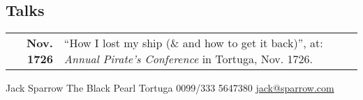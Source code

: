 \documentclass[lighthipster]{Mine}
\newlength{\rightcolwidth}
\begin{document}
\begin{paracol}{2}
\begin{minipage}[t]{0.3\textwidth}
		\section*{Talks}
		\begin{tabular}{>{\footnotesize\bfseries}r >{\footnotesize}p{}}
			Nov. 1726 & ``How I lost my ship (\& and how to get it back)'', at: \emph{Annual Pirate's Conference} in Tortuga, Nov. 1726.
		\end{tabular}
	\end{minipage}






	\vfill{} %

	\setlength{\parindent}{0pt}
	\begin{minipage}[t]{\rightcolwidth}
		\begin{center}\fontfamily{\sfdefault}\selectfont \color{black!70}
			{\small Jack Sparrow  The Black Pearl  Tortuga  0099/333 5647380 \newline{} \protect\url{jack@sparrow.com}
			}
		\end{center}
	\end{minipage}

\end{paracol}
\end{document}
